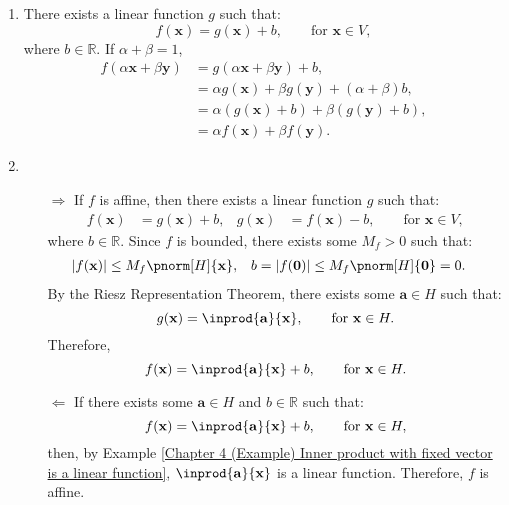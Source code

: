 \documentclass{huhtakm-template-book-v2}
\begin{document}
    \begin{proofing}
        \begin{enumerate}
            \item There exists a linear function $g$ such that:
            \begin{equation*}
                f(\mathbf{x})=g(\mathbf{x})+b, \qquad \text{for } \mathbf{x}\in V,
            \end{equation*}
            where $b\in\mathbb{R}$. If $\alpha+\beta=1$,
            \begin{align*}
                f(\alpha\mathbf{x}+\beta\mathbf{y})&=g(\alpha\mathbf{x}+\beta\mathbf{y})+b,\\
                \tag{$\alpha+\beta=1$}
                &=\alpha g(\mathbf{x})+\beta g(\mathbf{y})+(\alpha+\beta)b,\\
                &=\alpha(g(\mathbf{x})+b)+\beta(g(\mathbf{y})+b),\\
                &=\alpha f(\mathbf{x})+\beta f(\mathbf{y}).
            \end{align*}
            \item \begin{itemize}
            	\item[$\Longrightarrow$] If $f$ is affine, then there exists a linear function $g$ such that:
            	\begin{align*}
            		f(\mathbf{x})&=g(\mathbf{x})+b, & g(\mathbf{x})&=f(\mathbf{x})-b, \qquad \text{for } \mathbf{x}\in V,
            	\end{align*}
            	where $b\in\mathbb{R}$. Since $f$ is bounded, there exists some $M_{f}>0$ such that:
            	\begin{align*}
            		\abs{f(\mathbf{x})}&\leq M_{f}\pnorm[H]{\mathbf{x}}, & b=\abs{f(\mathbf{0})}&\leq M_{f}\pnorm[H]{\mathbf{0}}=0.
            	\end{align*}
            	By the Riesz Representation Theorem, there exists some $\mathbf{a}\in H$ such that:
            	\begin{equation*}
            		g(\mathbf{x})=\inprod{\mathbf{a}}{\mathbf{x}}, \qquad \text{for } \mathbf{x}\in H.
            	\end{equation*}
            	Therefore,
            	\begin{equation*}
            		f(\mathbf{x})=\inprod{\mathbf{a}}{\mathbf{x}}+b, \qquad \text{for } \mathbf{x}\in H.
            	\end{equation*}
            	\item[$\Longleftarrow$] If there exists some $\mathbf{a}\in H$ and $b\in\mathbb{R}$ such that:
            	\begin{equation*}
            		f(\mathbf{x})=\inprod{\mathbf{a}}{\mathbf{x}}+b, \qquad \text{for } \mathbf{x}\in H,
            	\end{equation*}
            	then, by Example \ref{Chapter 4 (Example) Inner product with fixed vector is a linear function}, $\inprod{\mathbf{a}}{\mathbf{x}}$ is a linear function. Therefore, $f$ is affine.
            \end{itemize}
        \end{enumerate}
    \end{proofing}
    \newpage
\end{document}
